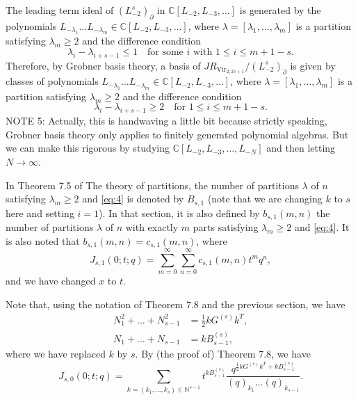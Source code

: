 \documentclass[a4paper, 12pt, reqno]{amsart}
\theoremstyle{remark}
\DeclareMathOperator{\Vir}{Vir}
\begin{document}
The leading term ideal of $(L_{-2}^s)_{\partial}$ in $\mathbb{C}[L_{-2}, L_{-3}, \dots]$ is generated by the polynomials $L_{-\lambda_1} \dots L_{-\lambda_m} \in \mathbb{C}[L_{-2}, L_{-3}, \dots]$, where $\lambda = [\lambda_1, \dots, \lambda_m]$ is a partition satisfying $\lambda_m \ge 2$ and the difference condition
\begin{equation}
  \label{eq:3}
  \lambda_i - \lambda_{i + s - 1} \le 1 \quad \text{for some $i$ with $1 \le i \le m + 1 - s$}.
\end{equation}
Therefore, by Grobner basis theory, a basis of $JR_{\Vir_{2, 2s + 1}}/(L_{-2}^s)_{\partial}$ is given by classes of polynomials $L_{-\lambda_1} \dots L_{-\lambda_m} \in \mathbb{C}[L_{-2}, L_{-3}, \dots]$, where $\lambda = [\lambda_1, \dots, \lambda_m]$ is a partition satisfying $\lambda_m \ge 2$ and the difference condition
\begin{equation}
  \label{eq:4}
  \lambda_i - \lambda_{i + s - 1} \ge 2 \quad \text{for $1 \le i \le m + 1 - s$}.
\end{equation}
NOTE 5: Actually, this is handwaving a little bit because strictly speaking, Grobner basis theory only applies to finitely generated polynomial algebras.
But we can make this rigorous by studying $\mathbb{C}[L_{-2}, L_{-3}, \dots, L_{-N}]$ and then letting $N \to \infty$.

In Theorem 7.5 of The theory of partitions, the number of partitions $\lambda$ of $n$ satisfying $\lambda_m \ge 2$ and \eqref{eq:4} is denoted by $B_{s, 1}$ (note that we are changing $k$ to $s$ here and setting $i = 1$).
In that section, it is also defined by $b_{s, 1}(m, n)$ the number of partitions $\lambda$ of $n$ with exactly $m$ parts satisfying $\lambda_m \ge 2$ and \eqref{eq:4}.
It is also noted that $b_{s, 1}(m, n) = c_{s, 1}(m, n)$, where
\begin{equation*}
  J_{s, 1}(0; t; q) = \sum_{m = 0}^{\infty}\sum_{n = 0}^{\infty}c_{s, 1}(m, n)t^mq^n,
\end{equation*}
and we have changed $x$ to $t$.

Note that, using the notation of Theorem 7.8 and the previous section, we have
\begin{align*}
  N_1^2 + \dots + N_{s - 1}^2 &= \frac{1}{2}kG^{(s)}k^T, \\
  N_1 + \dots + N_{s - 1} &= kB^{(s)}_{s - 1},
\end{align*}
where we have replaced $k$ by $s$.
By (the proof of) Theorem 7.8, we have
\begin{equation*}
  J_{s, 0}(0; t; q) = \sum_{k = (k_1, \dots, k_s) \in \mathbb{N}^{s - 1}}t^{kB^{(s)}_{s - 1}}\frac{q^{\frac{1}{2}kG^{(s)}k^T + kB^{(s)}_{s - 1}}}{(q)_{k_1}\dots(q)_{k_{s - 1}}}.
\end{equation*}
\end{document}
